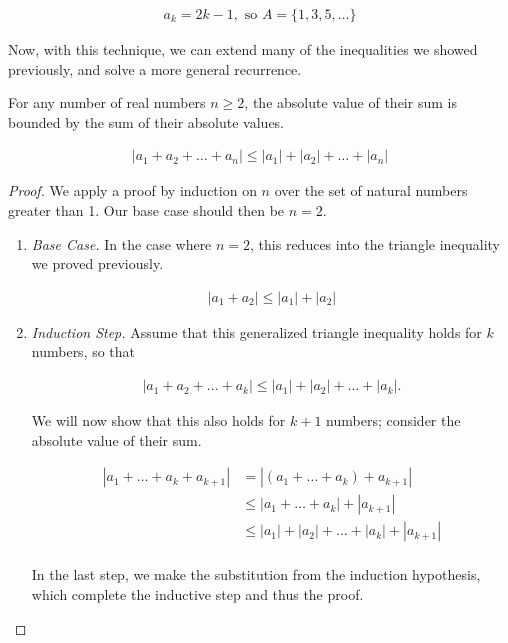 \begin{align*}
	a_k = 2k - 1, \text{ so } A = \{1, 3, 5, \dots \}
\end{align*}

Now, with this technique, we can extend many of the inequalities we showed previously, and solve a more general recurrence.

\vspace{\baselineskip}
\begin{theorem}
	For any number of real numbers $n \ge 2$, the absolute value of their sum is bounded by the sum of their absolute values.
	
	\begin{align*}
		|a_1 + a_2 + \dots + a_n| \le |a_1| + |a_2| + \dots + |a_n|
	\end{align*}
\end{theorem}
\begin{proof}
	We apply a proof by induction on $n$ over the set of natural numbers greater than 1. Our base case should then be $n = 2$.
	
	\vspace{\baselineskip}
	\begin{enumerate}
		\item \emph{Base Case.} In the case where $n = 2$, this reduces into the triangle inequality we proved previously.
		
		\begin{align*}
			|a_1 + a_2| \le |a_1| + |a_2|
		\end{align*}
		
		\item \emph{Induction Step.} Assume that this generalized triangle inequality holds for $k$ numbers, so that
		
		\begin{align*}
			|a_1 + a_2 + \dots + a_k| \le |a_1| + |a_2| + \dots + |a_k|.
		\end{align*}
		
		 We will now show that this also holds for $k + 1$ numbers;  consider the absolute value of their sum.
		 
		 \begin{align*}
		 	|a_1 + \dots + a_k + a_{k + 1}| &= |(a_1 + \dots + a_k) + a_{k + 1}| \\
		 	&\le |a_1 + \dots + a_k| + |a_{k + 1}| \\
		 	&\le |a_1| + |a_2| + \dots + |a_k| + |a_{k + 1}| \\
		 \end{align*}
		 
		 In the last step, we make the substitution from the induction hypothesis, which complete the inductive step and thus the proof.
	\end{enumerate}
\end{proof}
\vspace{\baselineskip}

